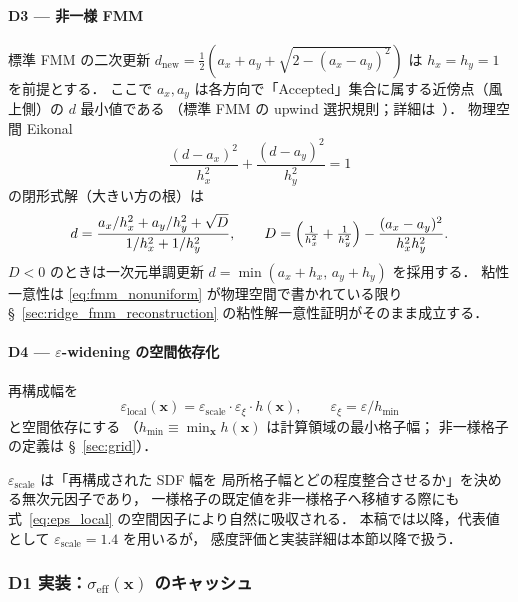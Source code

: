 \paragraph{D3 — 非一様 FMM}
標準 FMM の二次更新
$d_\text{new}=\tfrac{1}{2}(a_x+a_y+\sqrt{2-(a_x-a_y)^2})$
は $h_x=h_y=1$ を前提とする．
ここで $a_x, a_y$ は各方向で「Accepted」集合に属する近傍点（風上側）の $d$ 最小値である
（標準 FMM の upwind 選択規則；詳細は~\cite{Sethian1996}）．
物理空間 Eikonal
\begin{equation}
  \frac{(d-a_x)^2}{h_x^2}+\frac{(d-a_y)^2}{h_y^2}=1
  \label{eq:fmm_nonuniform}
\end{equation}
の閉形式解（大きい方の根）は
\begin{equation}
  d = \frac{a_x/h_x^2 + a_y/h_y^2 + \sqrt{D}}
           {1/h_x^2 + 1/h_y^2},\qquad
  D = \Bigl(\tfrac{1}{h_x^2}+\tfrac{1}{h_y^2}\Bigr)
      - \frac{(a_x-a_y)^2}{h_x^2 h_y^2}.
  \label{eq:fmm_closed_form}
\end{equation}
$D<0$ のときは一次元単調更新 $d=\min(a_x+h_x,\,a_y+h_y)$ を採用する．
粘性一意性は \eqref{eq:fmm_nonuniform} が物理空間で書かれている限り
§~\ref{sec:ridge_fmm_reconstruction} の粘性解一意性証明がそのまま成立する．

\paragraph{D4 — $\varepsilon$-widening の空間依存化}
再構成幅を
\begin{equation}
  \varepsilon_\text{local}(\bm{x})
  = \varepsilon_\text{scale}\cdot \varepsilon_\xi \cdot h(\bm{x}),
  \qquad \varepsilon_\xi = \varepsilon/h_\text{min}
  \label{eq:eps_local}
\end{equation}
と空間依存にする
（$h_\text{min} \equiv \min_{\bm{x}} h(\bm{x})$ は計算領域の最小格子幅；
非一様格子の定義は §~\ref{sec:grid}）．

\noindent
$\varepsilon_\text{scale}$ は「再構成された SDF 幅を
局所格子幅とどの程度整合させるか」を決める無次元因子であり，
一様格子の既定値を非一様格子へ移植する際にも
式~\eqref{eq:eps_local} の空間因子により自然に吸収される．
本稿では以降，代表値として $\varepsilon_\text{scale}=1.4$ を用いるが，
感度評価と実装詳細は本節以降で扱う．

\subsubsection{\texorpdfstring{D1 実装：$\sigma_\text{eff}(\bm{x})$ のキャッシュ}{D1 実装：σ\_eff(x) のキャッシュ}}
\label{sec:ridge_nu_sigma_impl}

